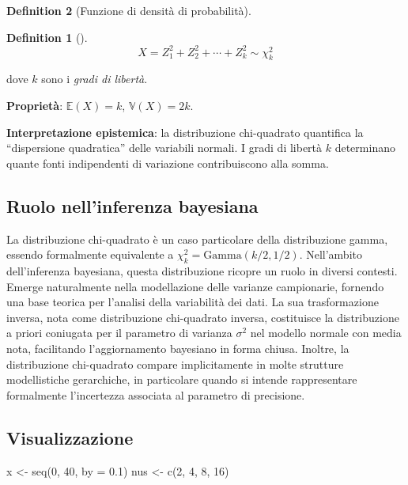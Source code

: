 \documentclass[
  letterpaper,
  DIV=11,
  numbers=noendperiod,
  oneside]{scrreprt}
\newenvironment{Shaded}{\begin{snugshade}}{\end{snugshade}}
\newcommand{\AttributeTok}[1]{\textcolor[rgb]{0.40,0.45,0.13}{#1}}
\newcommand{\DecValTok}[1]{\textcolor[rgb]{0.68,0.00,0.00}{#1}}
\newcommand{\FloatTok}[1]{\textcolor[rgb]{0.68,0.00,0.00}{#1}}
\newcommand{\FunctionTok}[1]{\textcolor[rgb]{0.28,0.35,0.67}{#1}}
\newcommand{\NormalTok}[1]{\textcolor[rgb]{0.00,0.23,0.31}{#1}}
\newcommand{\OtherTok}[1]{\textcolor[rgb]{0.00,0.23,0.31}{#1}}
\theoremstyle{definition}
\theoremstyle{plain}
\theoremstyle{definition}
\newtheorem{definition}{Definition}[chapter]
\theoremstyle{remark}
\begin{document}
\begin{definition}[Funzione di densità di
probabilità]
\begin{definition}[]
\[
X = Z_1^2 + Z_2^2 + \cdots + Z_k^2 \sim \chi^2_k
\]

dove \(k\) sono i \emph{gradi di libertà}.

\textbf{Proprietà}: \(\mathbb{E}(X) = k\), \(\mathbb{V}(X) = 2k\).

\end{definition}

\textbf{Interpretazione epistemica}: la distribuzione chi-quadrato
quantifica la ``dispersione quadratica'' delle variabili normali. I
gradi di libertà \(k\) determinano quante fonti indipendenti di
variazione contribuiscono alla somma.

\subsection{Ruolo nell'inferenza
bayesiana}\label{ruolo-nellinferenza-bayesiana-8}

La distribuzione chi-quadrato è un caso particolare della distribuzione
gamma, essendo formalmente equivalente a
\(\chi^2_k = \text{Gamma}(k/2, 1/2)\). Nell'ambito dell'inferenza
bayesiana, questa distribuzione ricopre un ruolo in diversi contesti.
Emerge naturalmente nella modellazione delle varianze campionarie,
fornendo una base teorica per l'analisi della variabilità dei dati. La
sua trasformazione inversa, nota come distribuzione chi-quadrato
inversa, costituisce la distribuzione a priori coniugata per il
parametro di varianza \(\sigma^2\) nel modello normale con media nota,
facilitando l'aggiornamento bayesiano in forma chiusa. Inoltre, la
distribuzione chi-quadrato compare implicitamente in molte strutture
modellistiche gerarchiche, in particolare quando si intende
rappresentare formalmente l'incertezza associata al parametro di
precisione.

\subsection{Visualizzazione}\label{visualizzazione-1}

\begin{Shaded}
\begin{Highlighting}[]
\NormalTok{x }\OtherTok{\textless{}{-}} \FunctionTok{seq}\NormalTok{(}\DecValTok{0}\NormalTok{, }\DecValTok{40}\NormalTok{, }\AttributeTok{by =} \FloatTok{0.1}\NormalTok{)}
\NormalTok{nus }\OtherTok{\textless{}{-}} \FunctionTok{c}\NormalTok{(}\DecValTok{2}\NormalTok{, }\DecValTok{4}\NormalTok{, }\DecValTok{8}\NormalTok{, }\DecValTok{16}\NormalTok{)}


\end{Highlighting}
\end{Shaded}
\end{definition}
\end{document}
